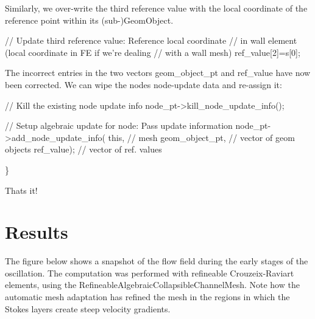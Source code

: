 Similarly, we over-\/write the third reference value with the local coordinate of the reference point within its (sub-\/){\ttfamily Geom\+Object}.


\begin{DoxyCodeInclude}
 \textcolor{comment}{// Update third reference value: Reference local coordinate}
 \textcolor{comment}{// in wall element (local coordinate in FE if we're dealing}
 \textcolor{comment}{// with a wall mesh)}
 ref\_value[2]=s[0];

\end{DoxyCodeInclude}


The incorrect entries in the two vectors {\ttfamily geom\+\_\+object\+\_\+pt} and {\ttfamily ref\+\_\+value} have now been corrected. We can wipe the node\textquotesingle{}s node-\/update data and re-\/assign it\+:


\begin{DoxyCodeInclude}
 \textcolor{comment}{// Kill the existing node update info}
 node\_pt->kill\_node\_update\_info(); 
 
 \textcolor{comment}{// Setup algebraic update for node: Pass update information}
 node\_pt->add\_node\_update\_info(
  \textcolor{keyword}{this},               \textcolor{comment}{// mesh}
  geom\_object\_pt,     \textcolor{comment}{// vector of geom objects}
  ref\_value);         \textcolor{comment}{// vector of ref. values}
 
\}

\end{DoxyCodeInclude}


That\textquotesingle{}s it!



 

\hypertarget{index_results}{}\section{Results}\label{index_results}
The figure below shows a snapshot of the flow field during the early stages of the oscillation. The computation was performed with refineable Crouzeix-\/\+Raviart elements, using the {\ttfamily Refineable\+Algebraic\+Collapsible\+Channel\+Mesh}. Note how the automatic mesh adaptation has refined the mesh in the regions in which the Stokes layers create steep velocity gradients.

